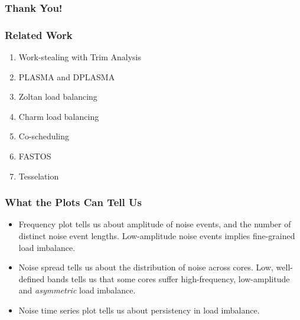 \begin{frame}
\frametitle{Thank You!}
\end{frame}

\begin{frame}
\frametitle{Related Work}
\begin{enumerate}

\item Work-stealing with Trim Analysis 
\item PLASMA and DPLASMA 
\item Zoltan load balancing 
\item Charm load balancing
\item Co-scheduling
\item FASTOS
\item Tesselation 

\end{enumerate} 
\end{frame}

\begin{frame} 
\frametitle{What the Plots Can Tell Us}


\begin{itemize}
\item \small Frequency plot tells us about amplitude of noise events,
  and the number of distinct noise event lengths. Low-amplitude noise events
  implies fine-grained load imbalance. \\ 

\item \small Noise spread tells us about the distribution of noise
  across cores. Low, well-defined bands tells us that some cores suffer
  high-frequency, low-amplitude and \textit{asymmetric} load
  imbalance. \\ 

\item \small Noise time series plot tells us about persistency in load
  imbalance. \\ 


\end{itemize}
\end{frame} 


